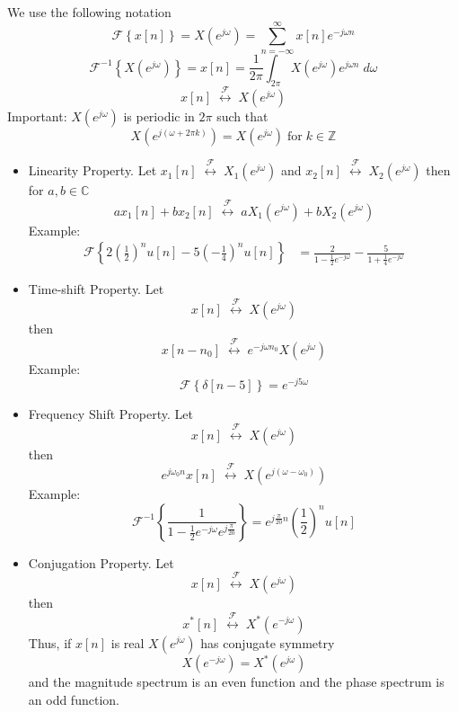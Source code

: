 We use the following notation
\[
\mathcal{F}\left\{ x[n] \right\} = X\left(e^{j\omega}\right) = \sum\limits_{n = -\infty}^{\infty} x[n] e^{-j\omega n}
\]
\[
\mathcal{F}^{-1}\left\{ X\left(e^{j\omega}\right) \right\} = x[n] =  \frac{1}{2\pi} \int_{2\pi} X\left(e^{j\omega}\right) e^{j\omega n} \; d\omega 
\]
\[
x[n] \; \stackrel{\mathcal{F}}{\longleftrightarrow} \;  X\left(e^{j\omega}\right)
\]
Important: $X\left(e^{j\omega}\right)$ is periodic in $2\pi$ such that
\[
X\left(e^{j(\omega + 2\pi k)}\right) =  X\left(e^{j\omega}\right) \;\text{for}\; k \in \mathbb{Z}
\]
\begin{itemize}
  \item Linearity Property.
  Let $x_1[n] \; \stackrel{\mathcal{F}}{\longleftrightarrow} \; X_1\left(e^{j\omega}\right)$ and $x_2[n] \; \stackrel{\mathcal{F}}{\longleftrightarrow} \; X_2\left(e^{j\omega}\right)$
  then for $a,b\in\mathbb{C}$
  \[
a x_1[n] + b x_2[n] \; \stackrel{\mathcal{F}}{\longleftrightarrow} \; a X_1\left(e^{j\omega}\right) + b X_2\left(e^{j\omega}\right)
\]
Example:
\begin{align*}
\mathcal{F}\left\{ 2\left( \frac{1}{2}\right)^nu[n] -5 \left( -\frac{1}{4}\right)^nu[n] \right\} &= \frac{2}{1-\frac{1}{2}e^{-j\omega}} - \frac{5}{1+\frac{1}{4}e^{-j\omega}} 
\end{align*}
\item Time-shift Property.
  Let
  \[
  x[n] \; \stackrel{\mathcal{F}}{\longleftrightarrow} \; X\left(e^{j\omega}\right)
  \]
  then
  \[
  x[n-n_0] \; \stackrel{\mathcal{F}}{\longleftrightarrow} \; e^{-j\omega n_0} X\left(e^{j\omega}\right)
  \]
  Example:
  \[
  \mathcal{F}\left\{ \delta[n-5] \right\} = e^{-j5\omega}
  \]
\item Frequency Shift Property.
  Let
  \[
  x[n] \; \stackrel{\mathcal{F}}{\longleftrightarrow} \; X\left(e^{j\omega}\right)
  \]
  then
  \[
  e^{j\omega_0 n} x[n] \; \stackrel{\mathcal{F}}{\longleftrightarrow} \; X\left(e^{j(\omega-\omega_0)}\right)
  \]
  Example:
  \[
  \mathcal{F}^{-1}\left\{ \frac{1}{1-\frac{1}{2}e^{-j\omega}e^{j\frac{\pi}{20}}} \right\} = e^{j\frac{\pi}{20} n} \left( \frac{1}{2}\right)^n u[n]
  \]
\item Conjugation Property.
  Let
  \[
  x[n] \; \stackrel{\mathcal{F}}{\longleftrightarrow} \; X\left(e^{j\omega}\right)
  \]
  then
  \[
  x^*[n] \; \stackrel{\mathcal{F}}{\longleftrightarrow} \; X^{*}\left(e^{-j\omega}\right)
  \]
  Thus, if $x[n]$ is real $X\left(e^{j\omega}\right)$ has conjugate symmetry
  \[
  X\left(e^{-j\omega}\right) = X^*\left(e^{j\omega}\right)
  \]
  and the magnitude spectrum is an even function and the phase spectrum is an odd function.

\end{itemize}
